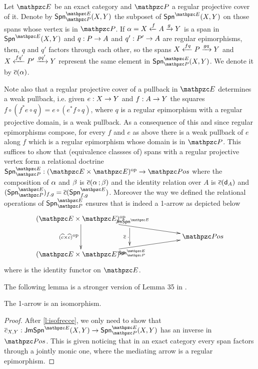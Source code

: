 Let $\ct{E}$ be an exact category and $\ct{P}$ a regular projective cover of it. Denote by $\Span{\ct{E}}_{\ct{P}}(X,Y)$ the subposet of $\Span{\ct{E}}(X,Y)$ on those spans whose vertex is in $\ct{P}$. If $\alpha=X \xleftarrow{f} A \xrightarrow{g} Y$ is a span  in $\Span{\ct{E}}(X,Y)$ and $\fun{q}{P}{A}$ and $\fun{q'}{P'}{A}$ are regular epimorphisms, then,  $q$ and $q'$ factors through each other, so the spans $X \xleftarrow{fq} P \xrightarrow{gq} Y$ and $X \xleftarrow{fq'} P' \xrightarrow{gq'} Y$ represent the same element in $\Span{\ct{E}}_{\ct{P}}(X,Y)$. 
We denote it by $\overline{c}(\alpha)$.



Note also that a regular projective cover of a pullback in $\ct{E}$ determines a weak pullback, i.e.  given $\fun{e}{X}{Y}$ and $\fun{f}{A}{Y}$ the squares $f\circ (f^*e\circ q)=e\circ (e^*f\circ q)$, where $q$ is a regular epimorphism with a regular projective domain, is a weak pullback. 
As a consequence of this and since regular epimorphisms compose, for every $f$ and $e$ as above there is a weak pullback of $e$ along $f$ 
which is a regular epimorphism whose domain is in $\ct{P}$.
This suffices to show that (equivalence classses of) spans with a regular projective vertex form a relational doctrine $\fun{\Span{\ct{E}}_{\ct{P}}}{\bop{\ct{E}}}{\Pos}$ where the composition of $\alpha$ and $\beta$ is $\overline{c}(\alpha\mathop{\mathbf{;}}\beta)$ and the identity relation over $A$ is $\overline{c}(\mathsf{d}_A)$ and $(\Span{\ct{E}}_{\ct{P}})_{f,g}= \lift{\coveredarr}(\Span{\ct{E}}_{f,g})$. 
Moreover the way we defined the relational operations of $\Span{\ct{E}}_{\ct{P}}$ ensures that  is indeed a 1-arrow as depicted below 
\[
\xymatrix@C=7.5em@R=1em{
{\bop{\ct{E}}}\ar[rd]^(.4){\jmSpan{\ct{E}}}_(.4){}="P"
\ar[dd]_{\bop{\fn{\coveredarr}}}^{}="F"
&\\
 & {\ct{Pos}}\\
{\bop{\ct{E}}}\ar[ru]_(.4){\Span{\ct{E}}_{\ct{P}}}^(.4){}="R"&
\ar"P";"R"_{\lift{\coveredarr}\kern.5ex\cdot\kern-.5ex}="b"
}
\]
 where  is the identity functor on $\ct{E}$.

The following lemma is a stronger version of Lemma 35 in \cite{CarboniA:regec}. 

\begin{lemma} \label{l:analogo0} 
The 1-arrow  
is an isomorphism.
\end{lemma}
\begin{proof} 
After \cref{l:isofrecce}, we only need to show that $\fun{\lift{\coveredarr}_{X,Y}}{\jmSpan{\ct{E}}(X,Y)}{\Span{\ct{E}}_{\ct{P}}(X,Y)}$ has an inverse in $\Pos$. This is given noticing that in an exact category every span factors through a jointly monic one, where the mediating arrow is a regular epimorphism.
\end{proof}

